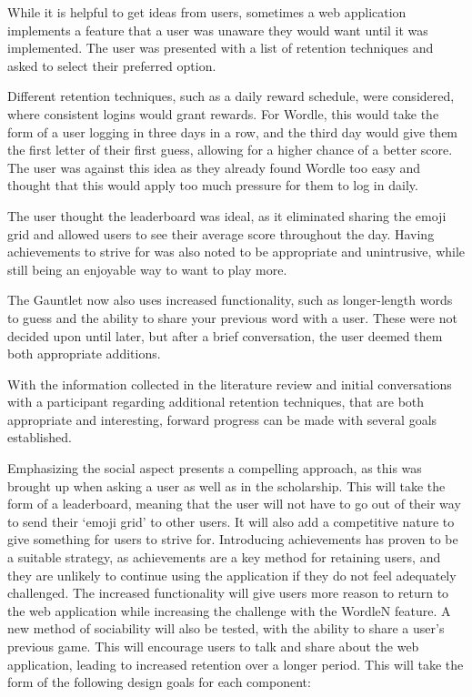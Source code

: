 While it is helpful to get ideas from users, sometimes a web application implements a feature that a user was unaware they would want until it was implemented. The user was presented with a list of retention techniques and asked to select their preferred option.

Different retention techniques, such as a daily reward schedule, were considered, where consistent logins would grant rewards. For Wordle, this would take the form of a user logging in three days in a row, and the third day would give them the first letter of their first guess, allowing for a higher chance of a better score. The user was against this idea as they already found Wordle too easy and thought that this would apply too much pressure for them to log in daily. 

The user thought the leaderboard was ideal, as it eliminated sharing the emoji grid and allowed users to see their average score throughout the day. Having achievements to strive for was also noted to be appropriate and unintrusive, while still being an enjoyable way to want to play more.

The Gauntlet now also uses increased functionality, such as longer-length words to guess and the ability to share your previous word with a user. These were not decided upon until later, but after a brief conversation, the user deemed them both appropriate additions. 

With the information collected in the literature review and initial conversations with a participant regarding additional retention techniques, that are both appropriate and interesting, forward progress can be made with several goals established.

Emphasizing the social aspect presents a compelling approach, as this was brought up when asking a user as well as in the scholarship. This will take the form of a leaderboard, meaning that the user will not have to go out of their way to send their ‘emoji grid’ to other users. It will also add a competitive nature to give something for users to strive for. Introducing achievements has proven to be a suitable strategy, as achievements are a key method for retaining users, and they are unlikely to continue using the application if they do not feel adequately challenged. The increased functionality will give users more reason to return to the web application while increasing the challenge with the WordleN feature. A new method of sociability will also be tested, with the ability to share a user's previous game. This will encourage users to talk and share about the web application, leading to increased retention over a longer period. This will take the form of the following design goals for each component:


